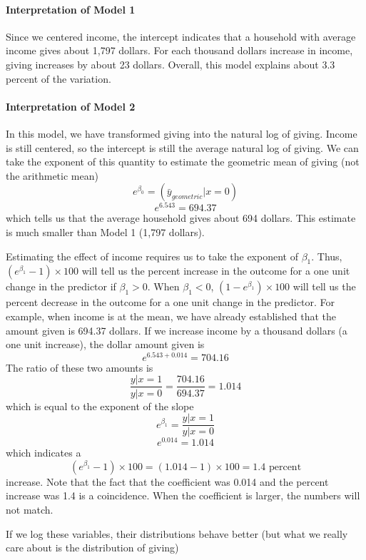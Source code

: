 \paragraph{Interpretation of Model 1}

Since we centered income, the intercept indicates that a household with average income gives about 1,797 dollars. For each thousand dollars increase in income, giving increases by about 23 dollars. Overall, this model explains about 3.3 percent of the variation.

\paragraph{Interpretation of Model 2}

In this model, we have transformed giving into the natural log of giving. Income is still centered, so the intercept is still the average natural log of giving. We can take the exponent of this quantity to estimate the geometric mean of giving (not the arithmetic mean)
\begin{equation}
e^{\beta_0} = \left(\bar{y}_{geometric}|x=0\right)
\end{equation}
\[
e^{6.543} = 694.37
\]
which tells us that the average household gives about 694 dollars. This estimate is much smaller than Model 1 (1,797 dollars).

Estimating the effect of income requires us to take the exponent of $\beta_1$. Thus, $\left(e^{\beta_1}-1\right)\times100$ will tell us the percent increase in the outcome for a one unit change in the predictor if $\beta_1>0$. When $\beta_1<0$, $\left(1-e^{\beta_1}\right)\times100$ will tell us the percent decrease in the outcome for a one unit change in the predictor. For example, when income is at the mean, we have already established that the amount given is 694.37 dollars. If we increase income by a thousand dollars (a one unit increase), the dollar amount given is
\[
e^{6.543+0.014} = 704.16
\]
The ratio of these two amounts is
\[
\frac{y|x=1}{y|x=0} = \frac{704.16}{694.37}=1.014
\]
which is equal to the exponent of the slope
\[
e^{\beta_1}=\frac{y|x=1}{y|x=0}
\]
\[
e^{0.014}=1.014
\]
which indicates a
\[
\left(e^{\beta_1}-1\right)\times100 = \left(1.014-1\right)\times100=1.4 \mbox{ percent}
\]
increase. Note that the fact that the coefficient was 0.014 and the percent increase was 1.4 is a coincidence. When the coefficient is larger, the numbers will not match.

If we log these variables, their distributions behave better (but what we really care about is the distribution of giving)

